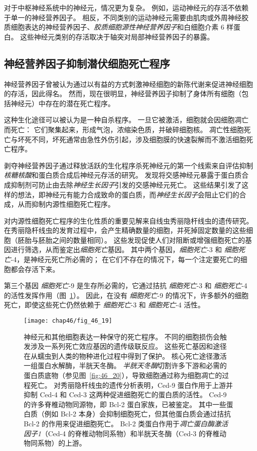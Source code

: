 对于中枢神经系统中的神经元，情况更为复杂。
例如，运动神经元的存活不依赖于单一的神经营养因子。
相反，不同类别的运动神经元需要由肌肉或外周神经胶质细胞表达的神经营养因子、\textit{胶质细胞源性神经营养因子}和白细胞介素 6 样蛋白。
这些神经元类别的存活取决于轴突对局部神经营养因子的暴露。



\subsection{神经营养因子抑制潜伏细胞死亡程序}

神经营养因子曾被认为通过以有益的方式刺激神经细胞的新陈代谢来促进神经细胞的存活，因此得名。
然而，现在很明显，神经营养因子抑制了身体所有细胞（包括神经元）中存在的潜在死亡程序。


这种生化途径可以被认为是一种自杀程序。
一旦它被激活，细胞就会因细胞凋亡而死亡：
它们聚集起来，形成气泡，浓缩染色质，并破碎细胞核。
凋亡性细胞死亡与坏死不同，坏死通常由急性外伤引起，涉及细胞膜的快速裂解而不激活细胞死亡程序。


剥夺神经营养因子通过释放活跃的生化程序杀死神经元的第一个线索来自评估抑制\textit{核糖核酸}和蛋白质合成后神经元存活的研究。
发现将交感神经元暴露于蛋白质合成抑制剂可防止由去除\textit{神经生长因子}引发的交感神经元死亡。
这些结果引发了这样的想法，即神经元有能力合成致命的蛋白质，而\textit{神经生长因子}会阻止它们的合成，从而抑制内源性细胞死亡程序。


对内源性细胞死亡程序的生化性质的重要见解来自线虫秀丽隐杆线虫的遗传研究。
在秀丽隐杆线虫的发育过程中，会产生精确数量的细胞，并死掉固定数量的这些细胞（胚胎与胚胎之间的数量相同）。
这些发现促使人们对阻断或增强细胞死亡的基因进行筛选，从而鉴定出\textit{细胞死亡}基因。
其中两个基因，\textit{细胞死亡}-3 和 \textit{细胞死亡}-4，是神经元死亡所必需的；
在它们不存在的情况下，每一个注定要死亡的细胞都会存活下来。

第三个基因 \textit{细胞死亡}-9 是生存所必需的，它通过拮抗 \textit{细胞死亡}-3 和 \textit{细胞死亡}-4 的活性发挥作用（图~\ref{fig:46_19}）。
因此，在没有 \textit{细胞死亡}-9 的情况下，许多额外的细胞死亡，即使这些死亡仍然依赖于 \textit{细胞死亡}-3 和 \textit{细胞死亡}-4 活性。


\begin{figure}[htbp]
	\centering
	\texttt{[image: chap46/fig\_46\_19]}
	\caption{神经元和其他细胞表达一种保守的死亡程序。
	不同的细胞损伤会触发涉及一系列死亡效应基因的遗传级联反应。
	这些死亡基因和途径在从蠕虫到人类的物种进化过程中得到了保护。
	核心死亡途径激活一组蛋白水解酶，半胱天冬酶。
	\textit{半胱天冬酶}切割许多下游和必需的蛋白质底物（参见图~\ref{fig:46_20}），导致细胞通过称为细胞凋亡的过程死亡。
	对秀丽隐杆线虫的遗传分析表明，Ced-9 蛋白作用于上游并抑制 Ced-4 和 Ced-3 这两种促进细胞死亡的蛋白质的活性。
	Ced-9 的许多脊椎动物同源物，即 Bcl-2 蛋白家族，已被鉴定。
	其中一些蛋白质（例如 Bcl-2 本身）会抑制细胞死亡，但其他蛋白质会通过拮抗 Bcl-2 的作用来促进细胞死亡。
	Bcl-2 类蛋白作用于\textit{凋亡蛋白酶激活因子1}（Ced-4 的脊椎动物同系物）和半胱天冬酶（Ced-3 的脊椎动物同系物）的上游。}
	\label{fig:46_19}
\end{figure}


